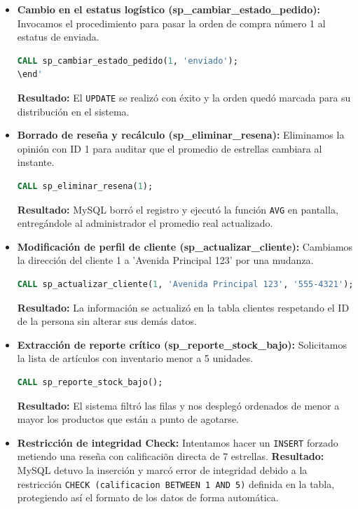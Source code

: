 \documentclass[10pt,letterpaper]{article}
\begin{document}
\begin{itemize}
    \item \textbf{Cambio en el estatus log\'istico (sp\_cambiar\_estado\_pedido):} Invocamos el procedimiento para pasar la orden de compra n\'umero 1 al estatus de enviada.
\begin{lstlisting}[language=SQL, frame=single, caption={Prueba de actualizaci\'on de estatus}]
CALL sp_cambiar_estado_pedido(1, 'enviado');
\end'
\end{lstlisting}
    \textbf{Resultado:} El \texttt{UPDATE} se realiz\'o con \'exito y la orden qued\'o marcada para su distribuci\'on en el sistema.

    \item \textbf{Borrado de rese\~na y rec\'alculo (sp\_eliminar\_resena):} Eliminamos la opini\'on con ID 1 para auditar que el promedio de estrellas cambiara al instante.
\begin{lstlisting}[language=SQL, frame=single, caption={Prueba de eliminaci\'on de opini\'on}]
CALL sp_eliminar_resena(1);
\end{lstlisting}
    \textbf{Resultado:} MySQL borr\'o el registro y ejecut\'o la funci\'on \texttt{AVG} en pantalla, entreg\'andole al administrador el promedio real actualizado.

    \item \textbf{Modificaci\'on de perfil de cliente (sp\_actualizar\_cliente):} Cambiamos la direcci\'on del cliente 1 a 'Avenida Principal 123' por una mudanza.
\begin{lstlisting}[language=SQL, frame=single, caption={Prueba de modificaci\'on de perfil}]
CALL sp_actualizar_cliente(1, 'Avenida Principal 123', '555-4321');
\end{lstlisting}
    \textbf{Resultado:} La informaci\'on se actualiz\'o en la tabla clientes respetando el ID de la persona sin alterar sus dem\'as datos.

    \item \textbf{Extracci\'on de reporte cr\'itico (sp\_reporte\_stock\_bajo):} Solicitamos la lista de art\'iculos con inventario menor a 5 unidades.
\begin{lstlisting}[language=SQL, frame=single, caption={Prueba de alerta de inventario bajo}]
CALL sp_reporte_stock_bajo();
\end{lstlisting}
    \textbf{Resultado:} El sistema filtr\'o las filas y nos despleg\'o ordenados de menor a mayor los productos que est\'an a punto de agotarse.

    \item \textbf{Restricci\'on de integridad Check:} Intentamos hacer un \texttt{INSERT} forzado metiendo una rese\~na con calificaci\~on directa de 7 estrellas.
    \textbf{Resultado:} MySQL detuvo la inserci\'on y marc\'o error de integridad debido a la restricci\'on \texttt{CHECK (calificacion BETWEEN 1 AND 5)} definida en la tabla, protegiendo as\'i el formato de los datos de forma automática.
\end{itemize}
\end{document}
